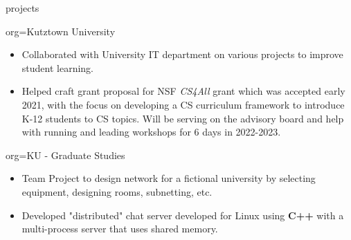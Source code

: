 \documentclass{resume}
\begin{document}
\begin{ResumeSection}{projects}
    \begin{ResumeSubsection}{org={Kutztown University}}
        \begin{itemize}
            \item Collaborated with University IT department on various projects to improve student learning. 
            \item Helped craft grant proposal for NSF \emph{CS4All} grant which was accepted early 2021,
            with the focus on developing a CS curriculum framework to introduce K-12 students to CS topics.  
            Will be serving on the advisory board and help with running and leading workshops for 6 days 
            in 2022-2023. 
        \end{itemize}
    \end{ResumeSubsection}
    \begin{ResumeSubsection}{org={KU - Graduate Studies}}
        \begin{itemize}
            \item Team Project to design network for a fictional university by selecting equipment, designing rooms, subnetting, etc.
            \item Developed "distributed" chat server developed for Linux using \textbf{C++} with a multi-process server that uses shared memory. 
        \end{itemize}
    \end{ResumeSubsection}
\end{ResumeSection}
\end{document}

